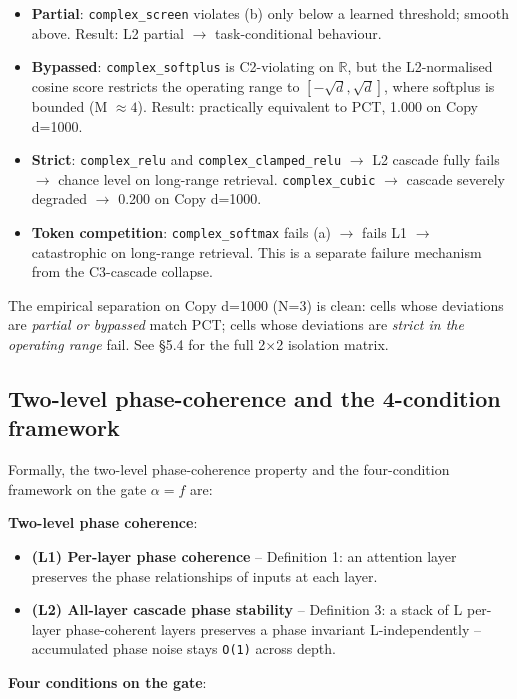 \documentclass[11pt,a4paper]{article}
\theoremstyle{plain}
\theoremstyle{definition}
\begin{document}
\begin{itemize}
  \item \textbf{Partial}: \texttt{complex\_screen} violates (b) only below a learned threshold; smooth above. Result: L2 partial $\to$ task-conditional behaviour.
  \item \textbf{Bypassed}: \texttt{complex\_softplus} is C2-violating on $\mathbb{R}$, but the L2-normalised cosine score restricts the operating range to $[-\sqrt{d}, \sqrt{d}]$, where softplus is bounded (M $\approx 4$). Result: practically equivalent to PCT, 1.000 on Copy d=1000.
  \item \textbf{Strict}: \texttt{complex\_relu} and \texttt{complex\_clamped\_relu} $\to$ L2 cascade fully fails $\to$ chance level on long-range retrieval. \texttt{complex\_cubic} $\to$ cascade severely degraded $\to$ 0.200 on Copy d=1000.
  \item \textbf{Token competition}: \texttt{complex\_softmax} fails (a) $\to$ fails L1 $\to$ catastrophic on long-range retrieval. This is a separate failure mechanism from the C3-cascade collapse.
\end{itemize}

The empirical separation on Copy d=1000 (N=3) is clean: cells whose deviations are \emph{partial or bypassed} match PCT; cells whose deviations are \emph{strict in the operating range} fail. See \S{}5.4 for the full 2$\times$2 isolation matrix.

\subsection{Two-level phase-coherence and the 4-condition framework}
Formally, the two-level phase-coherence property and the four-condition framework on the gate $\alpha  = f$ are:

\textbf{Two-level phase coherence}:

\begin{itemize}
  \item \textbf{(L1) Per-layer phase coherence} -- Definition 1: an attention layer preserves the phase relationships of inputs at each layer.
  \item \textbf{(L2) All-layer cascade phase stability} -- Definition 3: a stack of L per-layer phase-coherent layers preserves a phase invariant L-independently -- accumulated phase noise stays \texttt{O(1)} across depth.
\end{itemize}

\textbf{Four conditions on the gate}:
\end{document}
